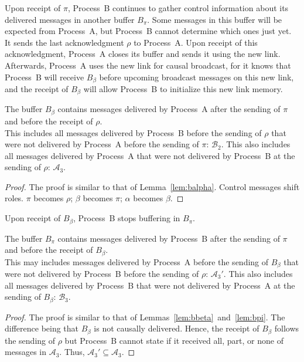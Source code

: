 \noindent Upon receipt of $\pi$, Process~B continues to gather control
information about its delivered messages in another buffer $B_\pi$. Some
messages in this buffer will be expected from Process~A, but Process~B cannot
determine which ones just yet. It sends the last acknowledgment $\rho$ to
Process~A. Upon receipt of this acknowledgment, Process~A closes its buffer and
sends it using the new link. Afterwards, Process~A uses the new link for causal
broadcast, for it knows that Process~B will receive $B_\beta$ before upcoming
broadcast messages on this new link, and the receipt of $B_\beta$ will allow
Process~B to initialize this new link memory.

\begin{lemma}
  The buffer $B_\beta$ contains messages delivered by Process~A after the
  sending of $\pi$ and before the receipt of $\rho$.\\
  This includes all messages delivered by Process~B before the sending of
  $\rho$ that were not delivered by Process~A before the sending of $\pi$:
  $\mathcal{B}_2$. This also includes all messages delivered by Process~A that
  were not delivered by Process~B at the sending of $\rho$: $\mathcal{A}_3$.
\end{lemma}
  
\begin{proof}
  The proof is similar to that of Lemma~\ref{lem:balpha}. Control messages
  shift roles. $\pi$ becomes $\rho$; $\beta$ becomes $\pi$; $\alpha$ becomes
  $\beta$.
\end{proof}

\noindent Upon receipt of $B_\beta$, Process~B stops buffering in $B_\pi$.
  
\begin{lemma}
  The buffer $B_\pi$ contains messages delivered by Process~B after the
  sending of $\pi$ and before the receipt of $B_\beta$.\\
  This may includes messages delivered by Process~A before the sending of
  $B_\beta$ that were not delivered by Process~B before the sending of $\rho$:
  $\mathcal{A}_3'$. This also includes all messages delivered by Process~B that
  were not delivered by Process~A at the sending of $B_\beta$:
  $\mathcal{B}_3$. 
\end{lemma}

\begin{proof}
  The proof is similar to that of Lemmas~\ref{lem:bbeta}~and~\ref{lem:bpi}. The
  difference being that $B_\beta$ is not causally delivered. Hence, the receipt
  of $B_\beta$ follows the sending of $\rho$ but Process~B cannot state if it
  received all, part, or none of messages in $\mathcal{A}_3$. Thus,
  $\mathcal{A}_3' \subseteq \mathcal{A}_3$.
\end{proof}

